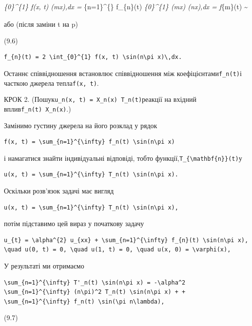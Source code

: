 \documentclass[
  ukrainian,
]{article}
\begin{document}
\int\emph{\{0\}\^{}\{1\} f(x, t) \sin(m\pi x),dx =
\sum}\{n=1\}\^{}\{\infty\} f\_\{n\}(t) \int\emph{\{0\}\^{}\{1\}
\sin(m\pi x) \sin(n\pi x),dx =  f}\{m\}(t)
\textsubscript{}\textasciitilde{}

або (після заміни t на p)

(9.6)

\begin{verbatim}
f_{n}(t) = 2 \int_{0}^{1} f(x, t) \sin(n\pi x)\,dx.
\end{verbatim}

Останнє співвідношення встановлює співвідношення між
коефіцієнтами\texttt{f\_n(t)}і часткою джерела тепла\texttt{f(x,\ t)}.

КРОК 2. (Пошук\texttt{u\_n(x,\ t)\ =\ X\_n(x)\ T\_n(t)}реакції на
вхідний вплив\texttt{f\_n(t)\ X\_n(x)}.)

Замінимо густину джерела на його розклад у рядок

\begin{verbatim}
f(x, t) = \sum_{n=1}^{\infty} f_n(t) \sin(n\pi x)
\end{verbatim}

і намагатися знайти індивідуальні відповіді, тобто
функції,\texttt{T\_\{\textbackslash{}mathbf\{n\}\}(t)}у

\begin{verbatim}
u(x, t) = \sum_{n=1}^{\infty} T_n(t) \sin(n\pi x).
\end{verbatim}

Оскільки розв'язок задачі має вигляд

\begin{verbatim}
u(x, t) = \sum_{n=1}^{\infty} T_n(t) \sin(n\pi x),
\end{verbatim}

потім підставимо цей вираз у початкову задачу

\begin{verbatim}
u_{t} = \alpha^{2} u_{xx} + \sum_{n=1}^{\infty} f_{n}(t) \sin(n\pi x),
\quad u(0, t) = 0, \quad u(1, t) = 0, \quad u(x, 0) = \varphi(x),
\end{verbatim}

У результаті ми отримаємо

\begin{verbatim}
\sum_{n=1}^{\infty} T'_n(t) \sin(n\pi x) = -\alpha^2 \sum_{n=1}^{\infty} (n\pi)^2 T_n(t) \sin(n\pi x) + + \sum_{n=1}^{\infty} f_n(t) \sin(\pi n\lambda),
\end{verbatim}

(9.7)
\end{document}
